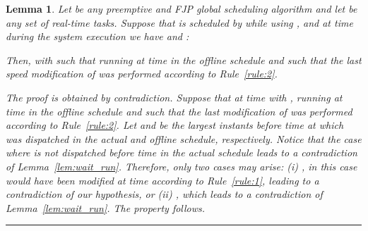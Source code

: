 \documentclass[times, 10pt,twocolumn]{article}
\newtheorem{Lemma}{Lemma}
\newenvironment{proof}[1][Proof]{\begin{trivlist}
\item[\hskip \labelsep {\bfseries #1}]}{\end{trivlist}}
\newcommand{\qed}{\rule{7pt}{7pt}}
\begin{document}
\begin{Lemma}
\label{cor:rule1}
Let  be any preemptive and FJP global scheduling algorithm and let  be any set of real-time tasks. Suppose that  is scheduled by  while using , and at time  during the system execution we have  and :

Then,  with  such that  running at time  in the offline schedule and such that the last speed modification of  was performed according to Rule~\ref{rule:2}.
\begin{proof} 
The proof is obtained by contradiction. Suppose that at time  with ,  running at time  in the offline schedule and such that the last modification of  was performed according to Rule~\ref{rule:2}. Let  and  be the largest instants before time  at which  was dispatched in the actual and offline schedule, respectively. Notice that the case where  is not dispatched before time  in the actual schedule leads to a contradiction of Lemma~\ref{lem:wait_run}. Therefore, only two cases may arise: (i) , in this case  would have been modified at time  according to Rule~\ref{rule:1}, leading to a contradiction of our hypothesis, or (ii) , which leads to a contradiction of Lemma~\ref{lem:wait_run}. The property follows. \hfill\qed
\end{proof}
\end{Lemma}
\end{document}
